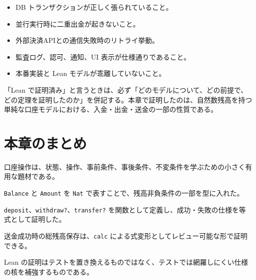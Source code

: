 \begin{itemize}
\item DB トランザクションが正しく張られていること。
\item 並行実行時に二重出金が起きないこと。
\item 外部決済APIとの通信失敗時のリトライ挙動。
\item 監査ログ、認可、通知、UI 表示が仕様通りであること。
\item 本番実装と Lean モデルが乖離していないこと。
\end{itemize}

\begin{warningbox}
「Lean で証明済み」と言うときは、必ず「どのモデルについて、どの前提で、どの定理を証明したのか」を併記する。本章で証明したのは、自然数残高を持つ単純な口座モデルにおける、入金・出金・送金の一部の性質である。
\end{warningbox}

\section{本章のまとめ}

口座操作は、状態、操作、事前条件、事後条件、不変条件を学ぶための小さく有用な題材である。

\texttt{Balance} と \texttt{Amount} を \texttt{Nat} で表すことで、残高非負条件の一部を型に入れた。

\texttt{deposit}、\texttt{withdraw?}、\texttt{transfer?} を関数として定義し、成功・失敗の仕様を等式として証明した。

送金成功時の総残高保存は、\texttt{calc} による式変形としてレビュー可能な形で証明できる。

Lean の証明はテストを置き換えるものではなく、テストでは網羅しにくい仕様の核を補強するものである。
